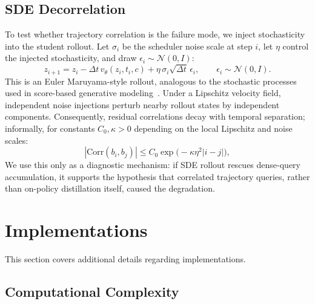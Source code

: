 \vspace{0.2cm}


\subsection{SDE Decorrelation}
\label{app:sde-decorrelation}

To test whether trajectory correlation is the failure mode, we inject stochasticity into the student rollout. Let $\sigma_i$ be the scheduler noise scale at step $i$, let $\eta$ control the injected stochasticity, and draw $\epsilon_i\sim\mathcal{N}(0,I)$:
\begin{equation}
  z_{i+1}=z_i-\Delta t\,v_\theta(z_i,t_i,c)+\eta\,\sigma_i\sqrt{\Delta t}\,\epsilon_i,
  \qquad \epsilon_i\sim\mathcal{N}(0,I).
  \label{eq:app-sde-rollout}
\end{equation}
This is an Euler Maruyama-style rollout, analogous to the stochastic processes used in score-based generative modeling~\cite{song2020score}. Under a Lipschitz velocity field, independent noise injections perturb nearby rollout states by independent components. Consequently, residual correlations decay with temporal separation; informally, for constants $C_0,\kappa>0$ depending on the local Lipschitz and noise scales:
\begin{equation}
  \left|\mathrm{Corr}(b_i,b_j)\right|
  \le C_0\exp\bigl(-\kappa\eta^2 |i-j|\bigr),
  \label{eq:app-corr-decay}
\end{equation}
We use this only as a diagnostic mechanism: if SDE rollout rescues dense-query accumulation, it supports the hypothesis that correlated trajectory queries, rather than on-policy distillation itself, caused the degradation.


\vspace{0.2cm}


\section{Implementations}
This section covers additional details regarding implementations.


\vspace{0.2cm}


\subsection{Computational Complexity}
\label{app:compute-complexity}

